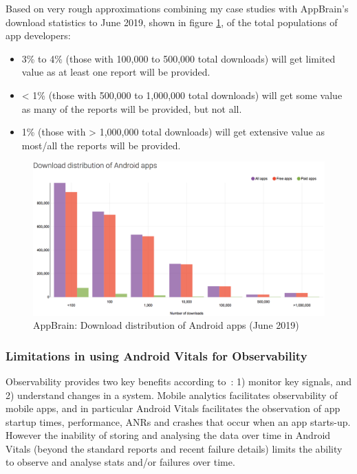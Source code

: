 Based on very rough approximations combining my case studies with AppBrain's download statistics to  June 2019, shown in figure \ref{fig:appbrain_download_statistics_jun_2019}\cite{appbrain_download_statistics_june_2019}, of the total populations of app developers:
\begin{itemize}
    \item 3\% to 4\% (those with 100,000 to 500,000 total downloads) will get limited value as at least one report will be provided.
    \item < 1\% (those with 500,000 to 1,000,000 total downloads) will get some value as many of the reports will be provided, but not all.
    \item 1\% (those with > 1,000,000 total downloads) will get extensive value as most/all the reports will be provided.
\end{itemize}

\begin{figure}[!htbp]
    \centering
    \includegraphics[width=\textwidth, keepaspectratio]{images/appbrain/AppBrain_Download_Statistics_20-Jun-2019.png}
    \caption{AppBrain: Download distribution of Android apps (June 2019)}
    \label{fig:appbrain_download_statistics_jun_2019}
\end{figure}

\subsubsection{Limitations in using Android Vitals for Observability}
Observability provides two key benefits according to~: 1) monitor key signals, and 2) understand changes in a system. Mobile analytics facilitates observability of mobile apps, and in particular Android Vitals facilitates the observation of app startup times, performance, ANRs and crashes that occur when an app starts-up. However the inability of storing and analysing the data over time in Android Vitals (beyond the standard reports and recent failure details) limits the ability to observe and analyse stats and/or failures over time.

